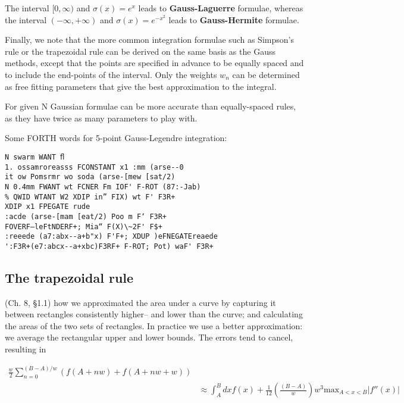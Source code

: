The interval $[0, \infty)$ and $\sigma(x) = e^{x}$ leads to \textbf{Gauss-Laguerre} formulae, whereas the interval $(-\infty, +\infty)$ and $\sigma(x) = e^{-x^{2}}$ leads to \textbf{Gauss-Hermite} formulae.

Finally, we note that the more common integration formulae such as Simpson’s rule or the trapezoidal rule can be derived on the same basis as the Gauss methods, except that the points are specified in advance to be equally spaced and to include the end-points of the interval. Only the weights $w_{n}$ can be determined as free fitting parameters that give the best approximation to the integral.

For given N Gaussian formulae can be more accurate than equally-spaced rules, as they have twice as many parameters to play with.


Some FORTH words for 5-point Gauss-Legendre integration:

\begin{lstlisting}
N swarm WANT ﬂ
1. ossamroreasss FCONSTANT x1 :mm (arse--0
it ow Pomsrmr wo soda (arse-[mew [sat/2)
N 0.4mm FWANT wt FCNER Fm IOF' F-ROT (87:-Jab)
% QWID WTANT W2 XDIP in” FIX) wt F' F3R+
XDIP x1 FPEGATE rude
:acde (arse-[mam [eat/2) Poo m F‘ F3R+
FOVERF—leFtNDERF+; Mia“ F(X)\~2F' F$+
:reeede (a7:abx--a+b"x) F'F+; XDUP )eFNEGATEreaede
':F3R+(e7:abcx--a+xbc)F3RF+ F-ROT; Pot) waF' F3R+
\end{lstlisting}

\subsection{The trapezoidal rule}

 (Ch. 8, \S1.1) how we approximated the area under a curve by capturing it between rectangles consistently higher-- and lower than the curve; and calculating the areas of the two sets of rectangles. In practice we use a better approximation: we average the rectangular upper and lower bounds. The errors tend to
cancel, resulting in

\begin{equation}
  \begin{split}
    \frac{w}{2} \sum_{n=0}^{(B-A)/w} \left( f(A+nw) + f(A+nw+w)\right) \\
    & \approx \int_{A}^{B} dx f(x) + \frac{1}{12} \left( \frac{(B-A)}{w} \right) w^{3} \text{max}_{A<x<B} \vert f''(x) \vert
  \end{split}
\end{equation}

